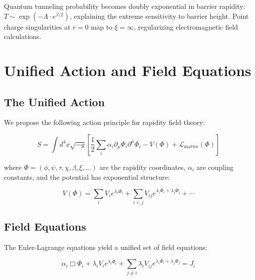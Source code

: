 \documentclass[12pt,a4paper]{article}
\begin{document}
Quantum tunneling probability becomes doubly exponential in barrier rapidity: 
$T \sim \exp(-A \cdot e^{\beta/2})$, explaining the extreme sensitivity to 
barrier height. Point charge singularities at $r = 0$ map to $\xi = \infty$, 
regularizing electromagnetic field calculations.

\section{Unified Action and Field Equations}

\subsection{The Unified Action}

We propose the following action principle for rapidity field theory:

\begin{equation}
S = \int d ^ { 4 } x \sqrt{ - g } 
\left[ 
    \frac{ 1 } { 2 } 
    \sum _ { i } 
    \alpha _ { i }     
    \partial _ { \mu } 
    \Phi _ { i }   
    \partial ^ { \mu } 
    \Phi _ { i } 
  - V ( \Phi ) 
  + \mathcal { L } _ { \text{matter} } 
    ( \Phi ) 
\right]
\end{equation}

where $\Phi = (\phi, \psi, \tau, \chi, \beta, \xi, \ldots)$ are the rapidity 
coordinates, $\alpha_i$ are coupling constants, and the potential has exponential 
structure:

\begin{equation}
V ( \Phi ) = \sum _ { i } V _ { i } e ^ { \lambda _ { i } \Phi _ { i } } 
+ \sum _ { i < j } V _ { i j } e ^ { \lambda _ { i } \Phi _ { i } + \lambda _ { j } 
\Phi _ { j } } + \cdots
\end{equation}

\subsection{Field Equations}

The Euler-Lagrange equations yield a unified set of field equations:

\begin{equation}
\alpha _ { i } 
\Box \Phi _ { i } 
+ \lambda _ { i } V _ { i } e ^ { \lambda _ { i } \Phi _ { i } } 
+ \sum _ { j \neq i } \lambda _ { i } V _ { i j } 
e ^ { \lambda _ { i } \Phi _ { i } + \lambda _ { j } \Phi _ { j } } = J _ { i }
\end{equation}
\end{document}

